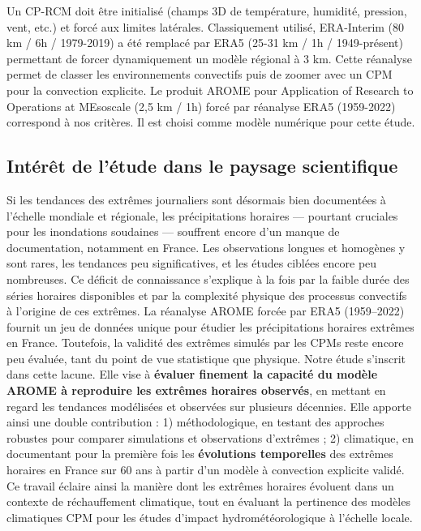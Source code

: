 \documentclass[
  article,
  nofooter,
  noheadings]{jss}
\begin{document}
Un CP-RCM doit être initialisé (champs 3D de température, humidité,
pression, vent, etc.) et forcé aux limites latérales. Classiquement
utilisé, ERA-Interim (80 km / 6h / 1979-2019) a été remplacé par ERA5
(25-31 km / 1h / 1949-présent) permettant de forcer dynamiquement un
modèle régional à 3 km. Cette réanalyse permet de classer les
environnements convectifs \citep{ecmwf_era5_data_documentation} puis de
zoomer avec un CPM pour la convection explicite. Le produit AROME pour
Application of Research to Operations at MEsoscale (2,5 km / 1h) forcé
par réanalyse ERA5 (1959-2022) correspond à nos critères. Il est choisi
comme modèle numérique pour cette étude.

\subsection{Intérêt de l'étude dans le paysage
scientifique}\label{intuxe9ruxeat-de-luxe9tude-dans-le-paysage-scientifique}

Si les tendances des extrêmes journaliers sont désormais bien
documentées à l'échelle mondiale et régionale, les précipitations
horaires --- pourtant cruciales pour les inondations soudaines ---
souffrent encore d'un manque de documentation, notamment en France. Les
observations longues et homogènes y sont rares, les tendances peu
significatives, et les études ciblées encore peu nombreuses. Ce déficit
de connaissance s'explique à la fois par la faible durée des séries
horaires disponibles et par la complexité physique des processus
convectifs à l'origine de ces extrêmes. La réanalyse AROME forcée par
ERA5 (1959--2022) fournit un jeu de données unique pour étudier les
précipitations horaires extrêmes en France. Toutefois, la validité des
extrêmes simulés par les CPMs reste encore peu évaluée, tant du point de
vue statistique que physique. Notre étude s'inscrit dans cette lacune.
Elle vise à \textbf{évaluer finement la capacité du modèle AROME à
reproduire les extrêmes horaires observés}, en mettant en regard les
tendances modélisées et observées sur plusieurs décennies. Elle apporte
ainsi une double contribution : 1) méthodologique, en testant des
approches robustes pour comparer simulations et observations d'extrêmes
; 2) climatique, en documentant pour la première fois les
\textbf{évolutions temporelles} des extrêmes horaires en France sur 60
ans à partir d'un modèle à convection explicite validé. Ce travail
éclaire ainsi la manière dont les extrêmes horaires évoluent dans un
contexte de réchauffement climatique, tout en évaluant la pertinence des
modèles climatiques CPM pour les études d'impact hydrométéorologique à
l'échelle locale.
\end{document}
